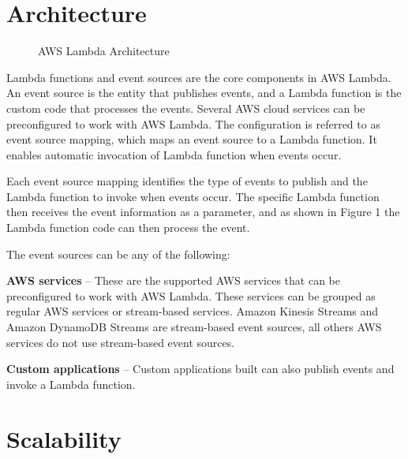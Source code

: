 \documentclass[9pt,twocolumn,twoside]{../../styles/osajnl}
\begin{document}
\section{Architecture}

\begin{figure}[h]
\centering
\graphicspath{ {images/} }
\caption{AWS Lambda Architecture} \cite{www-AWSLambda}
\label{fig:false-color}
\end{figure}

Lambda functions and event sources are the core components in AWS Lambda. An 
event source is the entity that publishes events, and a Lambda function is the 
custom code that processes the events. Several AWS cloud services can be 
preconfigured to work with AWS Lambda. The configuration is referred to as 
event source mapping, which maps an event source to a Lambda function. It 
enables automatic invocation of Lambda function when events occur.

Each event source mapping identifies the type of events to publish and the 
Lambda function to invoke when events occur. The specific Lambda function then 
receives the event information as a parameter, and as shown in Figure 1 the 
Lambda function code can then process the event.

The event sources can be any of the following:

\textbf{AWS services} – These are the supported AWS services that can be 
preconfigured to work with AWS Lambda. These services can be grouped as regular 
AWS services or stream-based services. Amazon Kinesis Streams 
\cite{www-AWSKinesis} and Amazon DynamoDB Streams \cite{www-AWSDynamoStream} 
are stream-based event sources, all others AWS services do not use stream-based 
event sources. 
 
\textbf{Custom applications} – Custom applications built can also publish 
events and invoke a Lambda function.

\section{Scalability}
\end{document}

